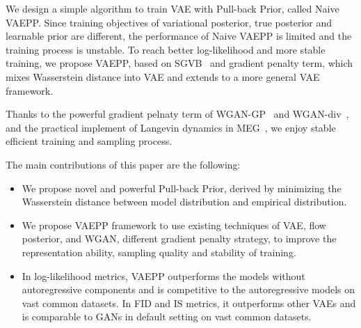 We design a simple algorithm to train VAE with Pull-back Prior, called Naive VAEPP. Since training objectives of variational posterior, true posterior and learnable prior are different, the performance of Naive VAEPP is limited and the training process is unstable. To reach better log-likelihood and more stable training, we propose VAEPP, based on SGVB~\cite{kingma2014auto} and gradient penalty term, which mixes Wasserstein distance into VAE and extends to a more general VAE framework. 

Thanks to the powerful gradient pelnaty term of WGAN-GP~\cite{gulrajani2017improved} and WGAN-div~\cite{wu2018wasserstein}, and the practical implement of Langevin dynamics in MEG~\cite{kumar2019maximum}, we enjoy stable efficient training and sampling process. 

The main contributions of this paper are the following:
\begin{itemize}
	\item We propose novel and powerful Pull-back Prior, derived by minimizing the Wasserstein distance between model distribution and empirical distribution. 
	\item We propose VAEPP framework to use existing techniques of VAE, \EG flow posterior, and WGAN, \EG different gradient penalty strategy, to improve the representation ability, sampling quality and stability of training. 
	\item In log-likelihood metrics, VAEPP outperforms the models without autoregressive components and is competitive to the autoregressive models on vast common datasets. In FID and IS metrics, it outperforms other VAEs and is comparable to GANs in default setting on vast common datasets. 
\end{itemize}
